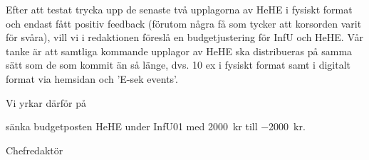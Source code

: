 \documentclass[../_main/handlingar.tex]{subfiles}
\begin{document}

Efter att testat trycka upp de senaste två upplagorna av HeHE i fysiskt format
och endast fått positiv feedback (förutom några få som tycker att korsorden varit
för svåra), vill vi i redaktionen föreslå en budgetjustering för InfU och HeHE.
Vår tanke är att samtliga kommande upplagor av HeHE ska distribueras på
samma sätt som de som kommit än så länge, dvs. 10 ex i fysiskt format samt i
digitalt format via hemsidan och 'E-sek events'. 

Vi yrkar därför på
\begin{attsatser}
    \att sänka budgetposten HeHE under InfU01 med \SI{2000}{kr} till \SI{-2000}{kr}.
\end{attsatser}

\begin{signatures}{1}
    \mvh 
    \signature{Max Mauritsson}{Chefredaktör}
\end{signatures}
\end{document}
